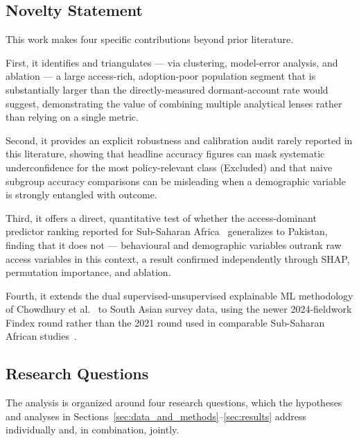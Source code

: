 \documentclass[conference]{IEEEtran}
\begin{document}
\subsection{Novelty Statement}
\label{subsec:novelty_statement}

This work makes four specific contributions beyond prior literature.

First, it identifies and triangulates --- via clustering, model-error
analysis, and ablation --- a large access-rich, adoption-poor population
segment that is substantially larger than the directly-measured
dormant-account rate would suggest, demonstrating the value of combining
multiple analytical lenses rather than relying on a single metric.

Second, it provides an explicit robustness and calibration audit rarely
reported in this literature, showing that headline accuracy figures can
mask systematic underconfidence for the most policy-relevant class
(Excluded) and that naive subgroup accuracy comparisons can be misleading
when a demographic variable is strongly entangled with outcome.

Third, it offers a direct, quantitative test of whether the access-dominant predictor ranking reported for Sub-Saharan Africa~\cite{saidy2025} generalizes
to Pakistan, finding that it does not --- behavioural and demographic
variables outrank raw access variables in this context, a result confirmed
independently through SHAP, permutation importance, and ablation.

Fourth, it extends the dual supervised-unsupervised
explainable ML methodology of Chowdhury et al.~\cite{chowdhury2026} to
South Asian survey data, using the newer 2024-fieldwork Findex round rather
than the 2021 round used in comparable Sub-Saharan African
studies~\cite{saidy2025}.

\subsection{Research Questions}
\label{subsec:research_questions}

The analysis is organized around four research questions, which the
hypotheses and analyses in Sections~\ref{sec:data_and_methods}--\ref{sec:results} address individually and, in
combination, jointly.
\end{document}
